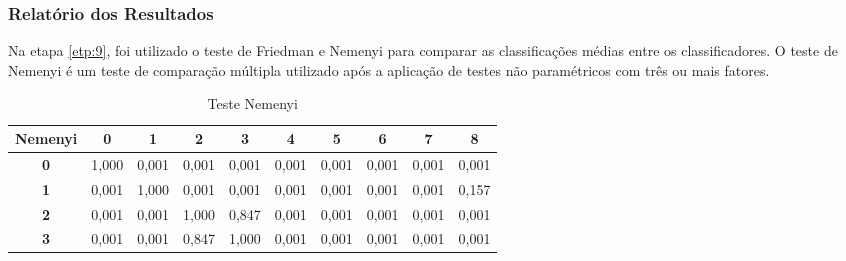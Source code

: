 \subsubsection{Relat\'orio dos Resultados}

Na etapa \ref{etp:9}, foi utilizado o teste de Friedman e Nemenyi para comparar as classificações médias entre os classificadores. O teste de Nemenyi é um teste de comparação múltipla utilizado após a aplicação de testes não paramétricos com três ou mais fatores.

\begin{table}[!htb]
	\centering
	\caption{Teste Nemenyi}
	\begin{tabular}{@{}clllllllll@{}}
		\toprule
		\multicolumn{1}{l}{\textbf{Nemenyi}} & \multicolumn{1}{c}{\textbf{0}} & \multicolumn{1}{c}{\textbf{1}} & \multicolumn{1}{c}{\textbf{2}} & \multicolumn{1}{c}{\textbf{3}} & \multicolumn{1}{c}{\textbf{4}} & \multicolumn{1}{c}{\textbf{5}} & \multicolumn{1}{c}{\textbf{6}} & \multicolumn{1}{c}{\textbf{7}} & \multicolumn{1}{c}{\textbf{8}} \\ \midrule
		\textbf{0}                           & 1,000                          & 0,001                          & 0,001                          & 0,001                          & 0,001                          & 0,001                          & 0,001                          & 0,001                          & 0,001                          \\
		\textbf{1}                           & 0,001                          & 1,000                          & 0,001                          & 0,001                          & 0,001                          & 0,001                          & 0,001                          & 0,001                          & 0,157                          \\
		\textbf{2}                           & 0,001                          & 0,001                          & 1,000                          & 0,847                          & 0,001                          & 0,001                          & 0,001                          & 0,001                          & 0,001                          \\
		\textbf{3}                           & 0,001                          & 0,001                          & 0,847                          & 1,000                          & 0,001                          & 0,001                          & 0,001                          & 0,001                          & 0,001                          \\

\end{tabular}
\end{table}
